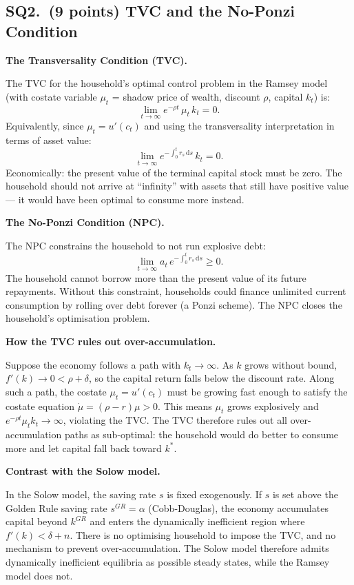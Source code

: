 \documentclass[a4paper,11pt]{article}
\newcommand{\dd}{\mathrm{d}}
\begin{document}
\subsection*{SQ2.\ (9 points) TVC and the No-Ponzi Condition}

\begin{answerbox}
\textbf{The Transversality Condition (TVC).}

The TVC for the household's optimal control problem in the Ramsey model (with costate
variable $\mu_t$ = shadow price of wealth, discount $\rho$, capital $k_t$) is:
\[
    \lim_{t\to\infty} e^{-\rho t}\,\mu_t\,k_t = 0.
\]
Equivalently, since $\mu_t = u'(c_t)$ and using the transversality interpretation in
terms of asset value:
\[
    \lim_{t\to\infty} e^{-\int_0^t r_s\,\dd s}\,k_t = 0.
\]
Economically: the present value of the terminal capital stock must be zero. The household
should not arrive at ``infinity'' with assets that still have positive value --- it would
have been optimal to consume more instead.

\textbf{The No-Ponzi Condition (NPC).}

The NPC constrains the household to not run explosive debt:
\[
    \lim_{t\to\infty} a_t\,e^{-\int_0^t r_s\,\dd s} \geq 0.
\]
The household cannot borrow more than the present value of its future repayments. Without
this constraint, households could finance unlimited current consumption by rolling over
debt forever (a Ponzi scheme). The NPC closes the household's optimisation problem.

\textbf{How the TVC rules out over-accumulation.}

Suppose the economy follows a path with $k_t \to \infty$. As $k$ grows without bound,
$f'(k) \to 0 < \rho + \delta$, so the capital return falls below the discount rate.
Along such a path, the costate $\mu_t = u'(c_t)$ must be growing fast enough to satisfy
the costate equation $\dot{\mu} = (\rho - r)\mu > 0$. This means $\mu_t$ grows
explosively and $e^{-\rho t}\mu_t k_t \to \infty$, violating the TVC. The TVC therefore
rules out all over-accumulation paths as sub-optimal: the household would do better to
consume more and let capital fall back toward $k^*$.

\textbf{Contrast with the Solow model.}

In the Solow model, the saving rate $s$ is fixed exogenously. If $s$ is set above the
Golden Rule saving rate $s^{GR} = \alpha$ (Cobb-Douglas), the economy accumulates capital
beyond $k^{GR}$ and enters the dynamically inefficient region where $f'(k) < \delta + n$.
There is no optimising household to impose the TVC, and no mechanism to prevent
over-accumulation. The Solow model therefore admits dynamically inefficient equilibria as
possible steady states, while the Ramsey model does not.
\end{answerbox}
\end{document}
